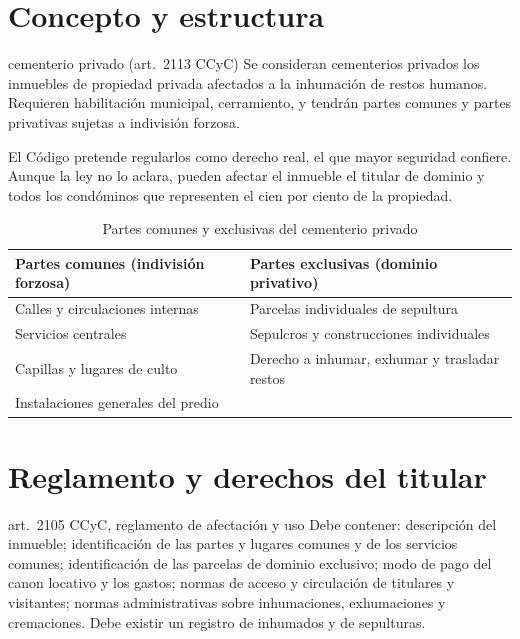 \documentclass[12pt,oneside]{book}
\begin{document}
\section{Concepto y estructura}

\begin{definicion}{cementerio privado (art.~2113 CCyC)}
Se consideran cementerios privados los inmuebles de propiedad privada afectados a la inhumación de restos humanos. Requieren habilitación municipal, cerramiento, y tendrán partes comunes y partes privativas sujetas a indivisión forzosa.
\end{definicion}

El Código pretende regularlos como derecho real, el que mayor seguridad confiere. Aunque la ley no lo aclara, pueden afectar el inmueble el titular de dominio y todos los condóminos que representen el cien por ciento de la propiedad.

\begin{table}[H]
\centering
\small
\begin{tabularx}{\textwidth}{>{\raggedright\arraybackslash}X>{\raggedright\arraybackslash}X}
\toprule
\textbf{Partes comunes (indivisión forzosa)} & \textbf{Partes exclusivas (dominio privativo)} \\
\midrule
Calles y circulaciones internas & Parcelas individuales de sepultura \\
Servicios centrales & Sepulcros y construcciones individuales \\
Capillas y lugares de culto & Derecho a inhumar, exhumar y trasladar restos \\
Instalaciones generales del predio & \\
\bottomrule
\end{tabularx}
\caption{Partes comunes y exclusivas del cementerio privado}
\end{table}

\section{Reglamento y derechos del titular}

\begin{regla}{art.~2105 CCyC, reglamento de afectación y uso}
Debe contener: descripción del inmueble; identificación de las partes y lugares comunes y de los servicios comunes; identificación de las parcelas de dominio exclusivo; modo de pago del canon locativo y los gastos; normas de acceso y circulación de titulares y visitantes; normas administrativas sobre inhumaciones, exhumaciones y cremaciones. Debe existir un registro de inhumados y de sepulturas.
\end{regla}
\end{document}
